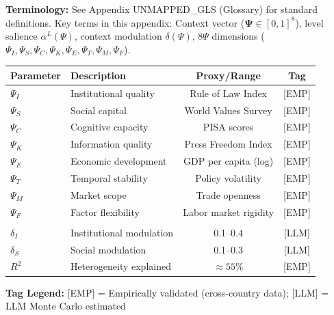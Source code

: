 
\begin{tcolorbox}[colback=gray!5!white, colframe=gray!50!black]
\textbf{Terminology:} See Appendix UNMAPPED_GLS (Glossary) for standard definitions.
Key terms in this appendix: Context vector ($\boldsymbol{\Psi} \in [0,1]^8$),
level salience $\alpha^L(\Psi)$, context modulation $\delta(\Psi)$,
8$\Psi$ dimensions ($\Psi_I, \Psi_S, \Psi_C, \Psi_K, \Psi_E, \Psi_T, \Psi_M, \Psi_F$).
\end{tcolorbox}

\begin{tcolorbox}[colback=blue!5!white, colframe=blue!75!black,
    title=\textbf{Epistemic Status: Key Parameters}]

\renewcommand{\arraystretch}{1.3}
\begin{tabular}{@{}llcc@{}}
\toprule
\textbf{Parameter} & \textbf{Description} & \textbf{Proxy/Range} & \textbf{Tag} \\
\midrule
$\Psi_I$ & Institutional quality & Rule of Law Index & [EMP] \\
$\Psi_S$ & Social capital & World Values Survey & [EMP] \\
$\Psi_C$ & Cognitive capacity & PISA scores & [EMP] \\
$\Psi_K$ & Information quality & Press Freedom Index & [EMP] \\
$\Psi_E$ & Economic development & GDP per capita (log) & [EMP] \\
$\Psi_T$ & Temporal stability & Policy volatility & [EMP] \\
$\Psi_M$ & Market scope & Trade openness & [EMP] \\
$\Psi_F$ & Factor flexibility & Labor market rigidity & [EMP] \\
\addlinespace
\multicolumn{4}{@{}l}{\textit{Modulation effects:}} \\
$\delta_I$ & Institutional modulation & 0.1--0.4 & [LLM] \\
$\delta_S$ & Social modulation & 0.1--0.3 & [LLM] \\
$R^2$ & Heterogeneity explained & $\approx 55\%$ & [EMP] \\
\bottomrule
\end{tabular}

\vspace{0.5em}
\textbf{Tag Legend:} [EMP] = Empirically validated (cross-country data);
[LLM] = LLM Monte Carlo estimated

\end{tcolorbox}

